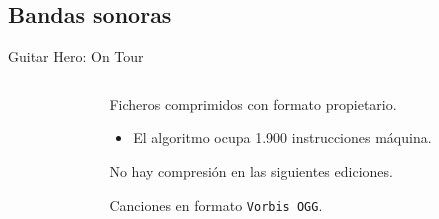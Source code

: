 \subsection{Bandas sonoras}
\begin{frame}{Guitar Hero: On Tour}

\begin{columns}
    \begin{column}{0.35\textwidth}
    \end{column}

    \begin{column}{0.65\textwidth}
    \begin{wideitemize}
        \item<1-> Ficheros comprimidos con formato propietario.
        \begin{itemize}
            \item<2-> El algoritmo ocupa 1.900 instrucciones máquina.
        \end{itemize}

        \item<3-> No hay compresión en las siguientes ediciones.

        \item<4-> Canciones en formato \texttt{Vorbis OGG}.
    \end{wideitemize}
    \end{column}
\end{columns}

\vfill
{}

\end{frame}

